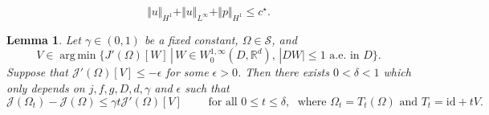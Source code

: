 \documentclass[10pt,a4paper]{amsart}
\newtheorem{lemma}{Lemma}
\DeclareMathOperator*{\argmin}{arg\,min}
\begin{document}
\begin{equation} 
\Vert u \Vert_{H^1} + \Vert u\Vert_{L^\infty} + \Vert p \Vert_{H^1} \leq c^\star.
\end{equation}

\begin{lemma} \label{decrease}
 Let {$\gamma \in (0,1)$ be a fixed constant,} $\Omega \in \mathcal S$, and
\begin{displaymath}
V \in \argmin \lbrace J'(\Omega)[W] \, | \, W \in W^{1,\infty}_0(D, \mathbb R^d), \, | DW | \leq 1 \mbox{ a.e. in } D \rbrace.
\end{displaymath}
Suppose that $\mathcal J'(\Omega)[V] \leq - \epsilon$ for some $\epsilon>0$. Then there exists 
$0< \delta <1$ which only depends on $j, f, g, D, d, \gamma$ and $\epsilon$ such that
\begin{displaymath}
\mathcal J(\Omega_{t}) - \mathcal J(\Omega) \leq \gamma t \mathcal J'(\Omega)[V] \qquad \mbox{ for all } 0 \leq t \leq \delta, \; \mbox{ where } \Omega_{t} = T_t(\Omega) \mbox{ and } T_t=\mbox{id}+ t V.
\end{displaymath}
\end{lemma}
\end{document}

